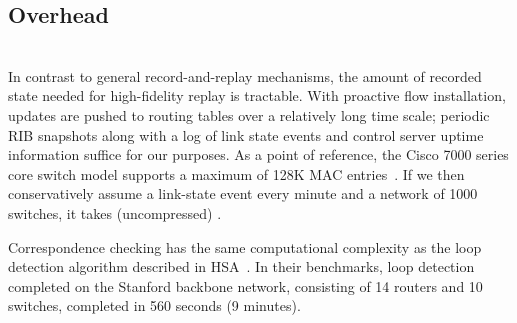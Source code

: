 \subsection{Overhead}

  \\

 In contrast to general record-and-replay
mechanisms, the amount of recorded state needed for
high-fidelity replay is tractable. With proactive flow installation, 
updates are pushed to routing tables over a relatively long time scale; periodic
RIB snapshots along with a log of link state events and control server uptime information 
suffice for our purposes.
As a point of reference, the Cisco 7000 series
core switch model supports a maximum of 128K MAC entries~\cite{cisco7000}.
If we then conservatively assume a link-state event every minute and a network
of 1000 switches, it takes  (uncompressed) 
.

 Correspondence checking has
the same computational complexity as the loop detection algorithm described in
HSA~\cite{hsa}. In their benchmarks, loop detection completed on the Stanford
backbone network, consisting of 14 routers and 10 switches, completed in 560 seconds
(9 minutes).

